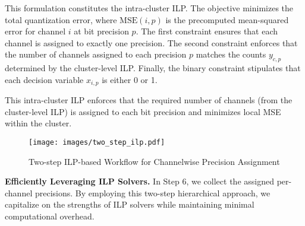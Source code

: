 This formulation constitutes the intra-cluster ILP. The objective minimizes the total quantization error, where \(\text{MSE}(i,p)\) is the precomputed mean-squared error for channel \(i\) at bit precision \(p\). The first constraint ensures that each channel is assigned to exactly one precision. The second constraint enforces that the number of channels assigned to each precision \(p\) matches the counts \(y_{c,p}\) determined by the cluster-level ILP. Finally, the binary constraint stipulates that each decision variable \(x_{i,p}\) is either 0 or 1.


\noindent
This intra-cluster ILP enforces that the required number of channels (from the cluster-level ILP) is assigned to each bit precision and minimizes local MSE within the cluster.


\begin{figure}[ht]
\begin{center}
\centerline{\texttt{[image: images/two\_step\_ilp.pdf]}}
\caption{Two-step ILP-based Workflow for Channelwise Precision Assignment}
\label{fig:twostepilp}
\end{center}
\end{figure}



\textbf{Efficiently Leveraging ILP Solvers.} In Step 6, we collect the assigned per-channel precisions. By employing this two-step hierarchical approach, we capitalize on the strengths of ILP solvers while maintaining minimal computational overhead.